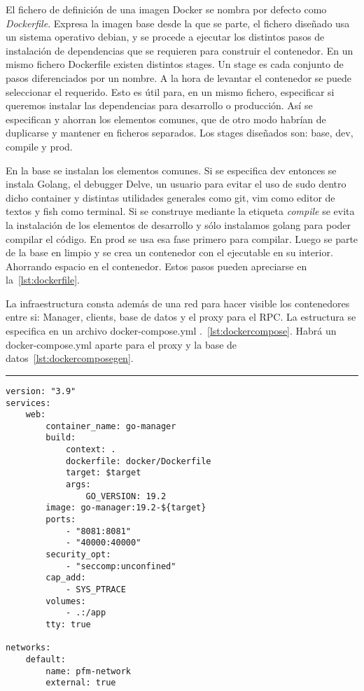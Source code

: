 El fichero de definición de una imagen Docker se nombra por defecto como \textit{Dockerfile}.
Expresa la imagen base desde la que se parte, el fichero diseñado usa un sistema operativo debian, y se procede a ejecutar los distintos pasos de instalación de dependencias que se requieren para construir el contenedor.
En un mismo fichero Dockerfile existen distintos stages.
Un stage es cada conjunto de pasos diferenciados por un nombre.
A la hora de levantar el contenedor se puede seleccionar el requerido.
Esto es útil para, en un mismo fichero, especificar si queremos instalar las dependencias para desarrollo o producción.
Así se especifican y ahorran los elementos comunes, que de otro modo habrían de duplicarse y mantener en ficheros separados.
Los stages diseñados son: base, dev, compile y prod.

En la base se instalan los elementos comunes.
Si se especifica dev entonces se instala Golang, el debugger Delve, un usuario para evitar el uso de sudo dentro dicho container y distintas utilidades generales como git, vim como editor de textos y fish como terminal.
Si se construye mediante la etiqueta \textit{compile} se evita la instalación de los elementos de desarrollo y sólo instalamos golang para poder compilar el código.
En prod se usa esa fase primero para compilar.
Luego se parte de la base en limpio y se crea un contenedor con el ejecutable en su interior.
Ahorrando espacio en el contenedor.
Estos pasos pueden apreciarse en la~\cref{lst:dockerfile}.

La infraestructura consta además de una red para hacer visible los contenedores entre si: Manager, clients, base de datos y el proxy para el RPC\@.
La estructura se especifica en un archivo docker-compose.yml .~\cref{lst:dockercompose}.
Habrá un docker-compose.yml aparte para el proxy y la base de datos~\cref{lst:dockercomposegen}.

\phantom{blank}
\vspace{10mm}

\hrule

\begin{lstlisting}[language=docker-compose-2,caption={Docker-compose.yml para cada proyecto golang: Manager, client y control},breaklines=true,label={lst:dockercompose}]
version: "3.9"
services:
    web:
        container_name: go-manager
        build:
            context: .
            dockerfile: docker/Dockerfile
            target: $target
            args:
                GO_VERSION: 19.2
        image: go-manager:19.2-${target}
        ports:
            - "8081:8081"
            - "40000:40000"
        security_opt:
            - "seccomp:unconfined"
        cap_add:
            - SYS_PTRACE
        volumes:
            - .:/app
        tty: true

networks:
    default:
        name: pfm-network
        external: true
\end{lstlisting}


